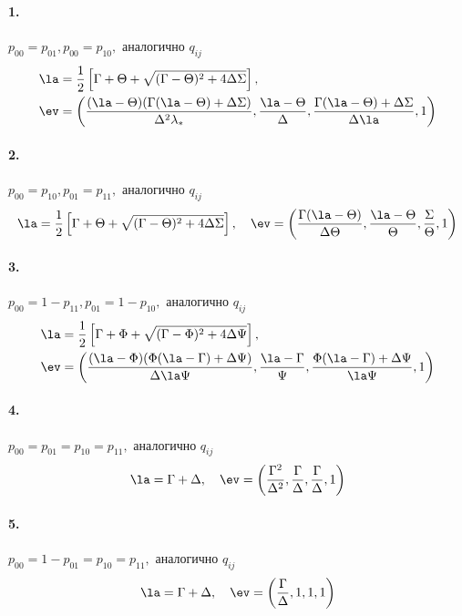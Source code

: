 \paragraph{1.} $p_{00} = p_{01}, p_{00} = p_{10},$ аналогично $q_{ij}$              
\begin{align*}
& \la = \frac{1}{2} \left[ \Gamma + \Theta + \sqrt{(\Gamma - \Theta)^2 + 4\Delta \Sigma}\right], \\
& \ev = \left(\frac{(\la - \Theta)(\Gamma (\la - \Theta) + \Delta\Sigma)}{\Delta^2 \lambda_\ast}, \frac{\la - \Theta}{\Delta}, \frac{\Gamma (\la - \Theta) + \Delta\Sigma}{\Delta \la}, 1 \right)
\end{align*}

\paragraph{2.} $p_{00} = p_{10}, p_{01} = p_{11},$ аналогично $q_{ij}$
\begin{equation*}
\la = \frac{1}{2} \left[\Gamma +\Theta + \sqrt{(\Gamma - \Theta)^2 +4 \Delta  \Sigma} \right], \quad \ev = \left(\frac{\Gamma (\la - \Theta)}{\Delta \Theta}, \frac{\la - \Theta}{\Theta}, \frac{\Sigma}{\Theta}, 1 \right)
\end{equation*}

\paragraph{3.} $p_{00} = 1 - p_{11}, p_{01} = 1 - p_{10},$ аналогично $q_{ij}$
\begin{align*}
\la & = \frac{1}{2} \left[\Gamma +\Phi + \sqrt{(\Gamma - \Phi)^2 +4 \Delta  \Psi} \right], \\
\ev & = \left( \frac{(\la -\Phi ) (\Phi  (\la -\Gamma )+\Delta  \Psi )}{\Delta  \la
   \Psi },\frac{\la -\Gamma }{\Psi },\frac{\Phi  (\la -\Gamma )+\Delta  \Psi
   }{\la  \Psi },1 \right)
\end{align*}

\paragraph{4.} $p_{00} = p_{01} = p_{10} = p_{11},$ аналогично $q_{ij}$
\begin{equation*}
\la = \Gamma +\Delta, \quad \ev = \left( \frac{\Gamma ^2}{\Delta ^2},\frac{\Gamma }{\Delta },\frac{\Gamma }{\Delta}, 1 \right)
\end{equation*}

\paragraph{5.} $p_{00} = 1 - p_{01} = p_{10} = p_{11},$ аналогично $q_{ij}$
\begin{equation*}
\la = \Gamma +\Delta, \quad \ev = \left( \frac{\Gamma }{\Delta }, 1, 1, 1 \right)
\end{equation*}

